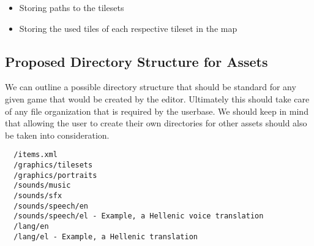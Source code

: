 \begin{itemize} 
\item Storing paths to the tilesets
\item Storing the used tiles of each respective tileset in the map
\end{itemize} 

\subsection{Proposed Directory Structure for Assets}

We can outline a possible directory structure that should be standard for any
given game that would be created by the editor. Ultimately this should take
care of any file organization that is required by the userbase. We should keep
in mind that allowing the user to create their own directories for other assets
should also be taken into consideration.

\begin{lstlisting}
  /items.xml
  /graphics/tilesets
  /graphics/portraits
  /sounds/music
  /sounds/sfx
  /sounds/speech/en
  /sounds/speech/el - Example, a Hellenic voice translation
  /lang/en
  /lang/el - Example, a Hellenic translation
\end{lstlisting}

